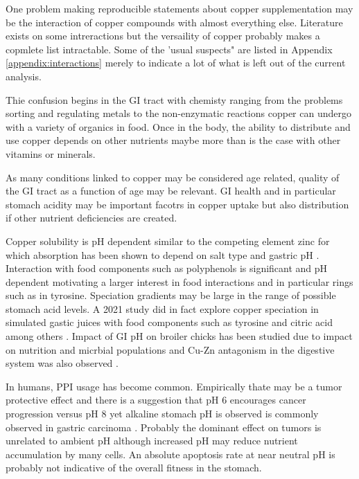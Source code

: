 \documentclass[aps,secnumarabic,balancelastpage,amsmath,amssymb,nofootinbib]{revtex4}
\newcommand{\mjmtolx}[1]{}
\newcommand{\mjmtol}[1]{
 \fbox{  
\begin{minipage}[t]{\textwidth}
{ \centering{\bf{Thinking outloud}} }
\par   
#1 
\end{minipage} 
}
}
\newcommand{\mjmrefapp}[1]{Appendix  \ref{appendix:#1}}
\begin{document}

One problem making reproducible statements about 
copper supplementation may be the interaction
of copper compounds with  almost everything else.
Literature exists on some intreractions but the versaility
of copper probably makes a copmlete list intractable.
Some of the 'usual suspects" are listed in \mjmrefapp{interactions}
merely to indicate a lot of what is left out of the current analysis.

Thie confusion begins in the GI tract with chemisty ranging from 
the problems sorting and regulating metals  to the
non-enzymatic reactions copper can undergo with a variety
of organics in food. Once in the body, the ability to 
distribute and use copper depends on other nutrients
maybe more than is the case with other vitamins or minerals. 

As many conditions linked to copper may be considered age
related,  quality of the GI tract as a function of age may be 
relevant. 
GI health and in particular stomach acidity may be important
facotrs in copper uptake but also distribution if other
nutrient deficiencies are created. 
\mjmtolx{Copper uptake may depend on anions such as chloride
at least in some fish 
\cite{Handy_Musonda_Phillips_Mechanisms_Gastrointestinal_Copper_2000}
,suggesting GI chloride per se may require more investigation.
Content in drinking water is variable and may be perceived
by humans depending on factors like pH \cite{Hong_Duncan_Dietrich_Effect_copper_speciation_2010} sugesting it may be perceived by dogs too.
}
Copper solubility is pH dependent \cite{10.1093/chemse/bjl010}
similar to the competing element zinc for which absorption
 has been shown to depend on salt type and
gastric pH \cite{PMID8577018}.
Interaction with food components such as polyphenols is significant
and pH dependent 
\cite{PMC3401972} motivating a larger interest in food interactions
and in particular rings such as in tyrosine. 
Speciation gradients
may be large in the range of possible stomach acid levels.  
A 2021 study did in fact explore copper speciation in simulated
gastic juices with food components such as 
tyrosine and citric acid among others \cite{PMC8441336}.
Impact of GI pH on broiler chicks has been studied due to impact
on nutrition and micrbial populations 
and Cu-Zn antagonism in the digestive system was also observed
\cite{Pang_Applegate_Effects_Dietary_Copper_2007}.

In humans, PPI usage has become common. Empirically thate
may be a tumor protective effect and  there is a suggestion
that  pH 6 encourages cancer progression
versus pH 8
\cite{PMC7085403}
yet alkaline stomach pH is observed is commonly observed
in gastric carcinoma
\cite{10.1007/978-4-431-68246-2_26}.
Probably the dominant effect on tumors is unrelated to ambient
pH although increased pH may reduce nutrient
accumulation by many cells. An absolute apoptosis rate
at near neutral pH is probably not indicative of the
overall fitness in the stomach. 
\end{document}
